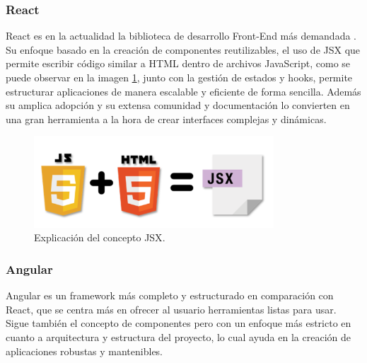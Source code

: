 \subsubsection*{React}
React es en la actualidad la biblioteca de desarrollo Front-End más demandada \cite{Frontend_Frameworks_DevJobsScanner}. Su enfoque basado en la creación de componentes reutilizables, el uso de JSX que permite escribir código similar a HTML dentro de archivos JavaScript, como se puede observar en la imagen \ref{fig:react}, junto con la gestión de estados y hooks,  permite estructurar aplicaciones de manera escalable y eficiente de forma sencilla. Además su amplica adopción y su extensa comunidad y documentación lo convierten en una gran herramienta a la hora de crear interfaces complejas y dinámicas.
\begin{figure}[H]
    \centering
    \includegraphics[width=0.8\textwidth]{fotos/react.PNG}
    \caption{Explicación del concepto JSX\textbf{}.}
    \label{fig:react}
\end{figure}
\subsubsection*{Angular}
Angular es un framework más completo y estructurado en comparación con React, que se centra más en ofrecer al usuario herramientas listas para usar. Sigue también el concepto de componentes pero con un enfoque más estricto en cuanto a arquitectura y estructura del proyecto, lo cual ayuda en la creación de aplicaciones robustas y mantenibles.

